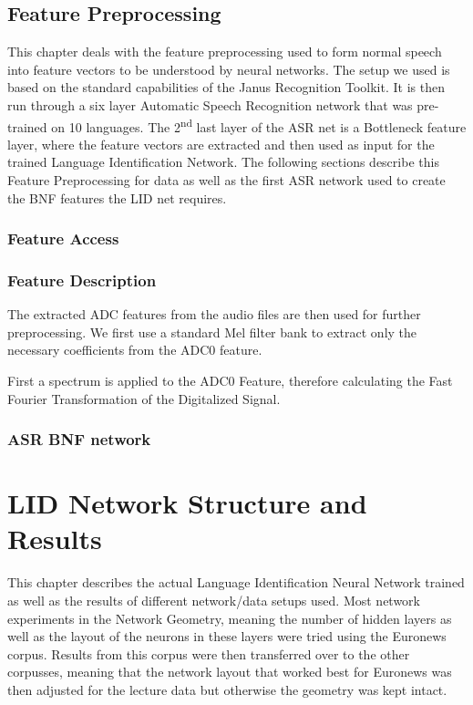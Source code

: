 \section{Feature Preprocessing}
\label{ch:FP}

This chapter deals with the feature preprocessing used to form normal speech into feature vectors to be understood by neural networks. The setup we used is based on the standard capabilities of the Janus Recognition Toolkit. It is then run through a six layer Automatic Speech Recognition network that was pre-trained on 10 languages. The 2\textsuperscript{nd} last layer of the ASR net is a Bottleneck feature layer, where the feature vectors are extracted and then used as input for the trained Language Identification Network. The following sections describe this Feature Preprocessing for data as well as the first ASR network used to create the BNF features the LID net requires.

\subsection{Feature Access}
\label{sec:FP:FA}

\subsection{Feature Description}
\label{sec:FP:FD}
The extracted ADC features from the audio files are then used for further preprocessing. We first use a standard Mel filter bank to extract only the necessary coefficients from the ADC0 feature. 

First a spectrum is applied to the ADC0 Feature, therefore calculating the Fast Fourier Transformation of the Digitalized Signal.

\subsection{ASR BNF network}
\label{sec:FP:Net}


\chapter{LID Network Structure and Results}
\label{ch:LIDNetwork}

This chapter describes the actual Language Identification Neural Network trained as well as the results of different network/data setups used. Most network experiments in the Network Geometry, meaning the number of hidden layers as well as the layout of the neurons in these layers were tried using the Euronews corpus. Results from this corpus were then transferred over to the other corpusses, meaning that the network layout that worked best for Euronews was then adjusted for the lecture data but otherwise the geometry was kept intact.

